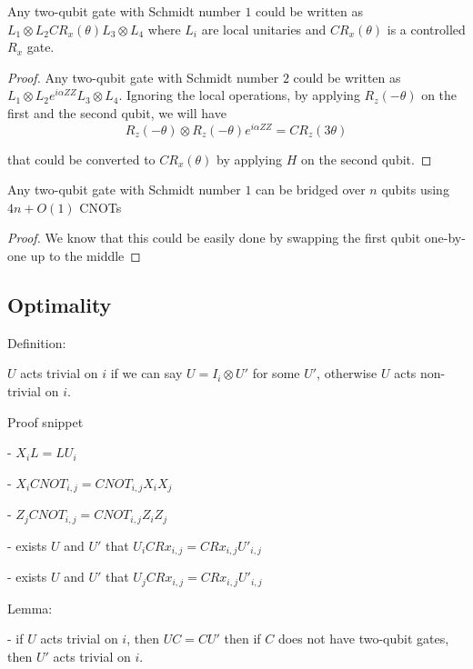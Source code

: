\begin{lemma}
  Any two-qubit gate with Schmidt number $1$ could be written as $L_1 \otimes L_2 CR_x(\theta) L_3 \otimes L_4$ where $L_i$ are local unitaries and $CR_x(\theta)$ is a controlled $R_x$ gate.
  \label{lem:decomposition-schmidt-2}
\end{lemma}
\begin{proof}
  Any two-qubit gate with Schmidt number $2$ could be written as $L_1 \otimes L_2 e^{i\alpha ZZ} L_3 \otimes L_4$. 
  Ignoring the local operations, by applying $R_z(-\theta)$ on the first and the second qubit, we will have 
  \begin{equation}
    R_z(-\theta) \otimes R_z(-\theta) e^{i\alpha ZZ} = CR_z(3\theta)
  \end{equation}
  
  that could be converted to $CR_x(\theta)$ by applying $H$ on the second qubit.
\end{proof}


\begin{theorem}
  Any two-qubit gate with Schmidt number $1$ can be bridged over $n$ qubits using $4n + O(1)$ CNOTs
\end{theorem}
  
\begin{proof}
  We know that this could be easily done by swapping the first qubit one-by-one up to the middle
\end{proof}

\subsection{Optimality}

Definition:

$U$ acts trivial on $i$ if we can say $U = I_i \otimes U'$ for some $U'$, otherwise $U$ acts non-trivial on $i$.

Proof snippet

- $X_i L = L U_i$

- $X_i CNOT_{i,j} = CNOT_{i,j} X_i X_j$

- $Z_j CNOT_{i,j} = CNOT_{i,j} Z_i Z_j$

- exists $U$ and $U'$ that $U_i CRx_{i,j} = CRx_{i,j} U'_{i,j}$

- exists $U$ and $U'$ that $U_j CRx_{i,j} = CRx_{i,j} U'_{i,j}$

Lemma:

- if $U$ acts trivial on $i$, then $U C = C U'$ then if $C$ does not have two-qubit gates, then $U'$ acts trivial on $i$.

